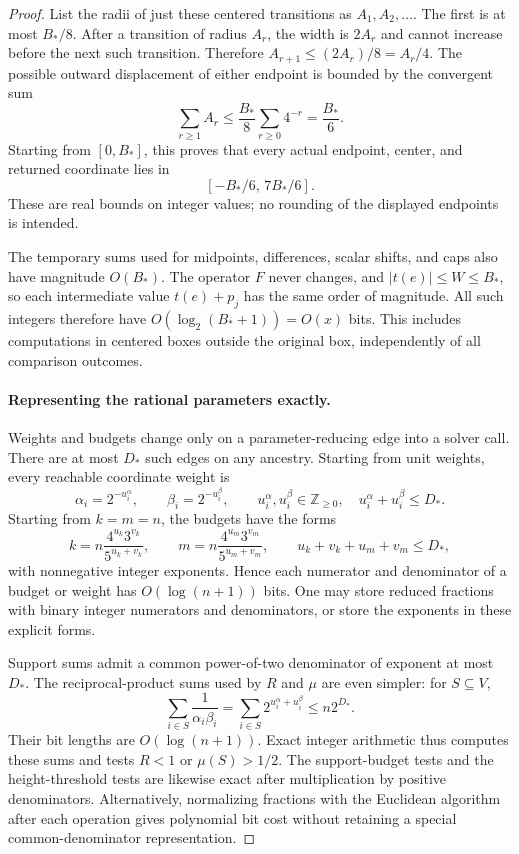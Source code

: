 \begin{proof}
List the radii of just these centered transitions as
\(A_1,A_2,\ldots\). The first is at most \(B_*/8\). After a
transition of radius \(A_r\), the width is \(2A_r\) and cannot
increase before the next such transition. Therefore
\(A_{r+1}\le(2A_r)/8=A_r/4\). The possible outward displacement
of either endpoint is bounded by the convergent sum
\[
        \sum_{r\ge1}A_r
           \le\frac{B_*}{8}\sum_{r\ge0}4^{-r}
           =\frac{B_*}{6}.
\]
Starting from \([0,B_*]\), this proves that every actual endpoint,
center, and returned coordinate lies in
\begin{equation}\label{cost:endpoint-bound}
                       [-B_*/6,\,7B_*/6].
\end{equation}
These are real bounds on integer values; no rounding of the displayed
endpoints is intended.

The temporary sums used for midpoints, differences, scalar shifts,
and caps also have magnitude \(O(B_*)\). The operator \(F\) never
changes, and \(|t(e)|\le W\le B_*\), so each intermediate value
\(t(e)+p_j\) has the same order of magnitude. All such integers
therefore have \(O(\log_2(B_*+1))=O(x)\) bits. This includes
computations in centered boxes outside the original box, independently
of all comparison outcomes.

\paragraph{Representing the rational parameters exactly.}
Weights and budgets change only on a parameter-reducing edge into a
solver call. There are at most \(D_*\) such edges on any ancestry.
Starting from unit weights, every reachable coordinate weight is
\[
       \alpha_i=2^{-u_i^\alpha},\qquad \beta_i=2^{-u_i^\beta},
       \qquad u_i^\alpha,u_i^\beta\in\mathbb Z_{\ge0},\quad
       u_i^\alpha+u_i^\beta\le D_*.
\]
Starting from \(k=m=n\), the budgets have the forms
\begin{equation}\label{cost:budget-forms}
 k=n\frac{4^{u_k}3^{v_k}}{5^{u_k+v_k}},\qquad
 m=n\frac{4^{u_m}3^{v_m}}{5^{u_m+v_m}},\qquad
 u_k+v_k+u_m+v_m\le D_*,
\end{equation}
with nonnegative integer exponents. Hence each numerator and
denominator of a budget or weight has \(O(\log(n+1))\) bits.
One may store reduced fractions with binary integer numerators and
denominators, or store the exponents in these explicit forms.

Support sums admit a common power-of-two denominator of exponent at
most \(D_*\). The reciprocal-product sums used by \(R\) and
\(\mu\) are even simpler: for \(S\subseteq V\),
\[
       \sum_{i\in S}\frac1{\alpha_i\beta_i}
           =\sum_{i\in S}2^{u_i^\alpha+u_i^\beta}
           \le n2^{D_*}.
\]
Their bit lengths are \(O(\log(n+1))\). Exact integer arithmetic
thus computes these sums and tests \(R<1\) or \(\mu(S)>1/2\).
The support-budget tests and the height-threshold tests are likewise
exact after multiplication by positive denominators. Alternatively,
normalizing fractions with the Euclidean algorithm after each
operation gives polynomial bit cost without retaining a special
common-denominator representation.


\end{proof}
